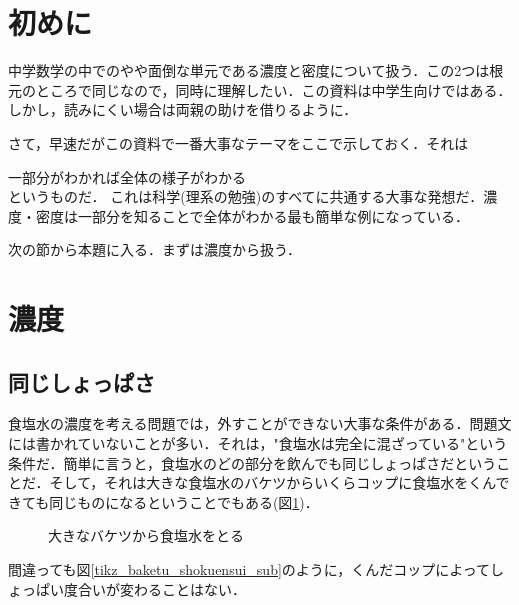 \documentclass[dvipdfmx,18pt]{jsarticle}
\begin{document}
    \section*{初めに}
    中学数学の中でのやや面倒な単元である濃度と密度について扱う．この2つは根元のところで同じなので，同時に理解したい．この資料は中学生向けではある．しかし，読みにくい場合は両親の助けを借りるように．

    さて，早速だがこの資料で一番大事なテーマをここで示しておく．それは

    {\centering 一部分がわかれば全体の様子がわかる\\}
    というものだ．
    これは科学(理系の勉強)のすべてに共通する大事な発想だ．濃度・密度は一部分を知ることで全体がわかる最も簡単な例になっている．


    次の節から本題に入る．まずは濃度から扱う．

    \section{濃度}
    \subsection{同じしょっぱさ}
    食塩水の濃度を考える問題では，外すことができない大事な条件がある．問題文には書かれていないことが多い．それは，"食塩水は完全に混ざっている"という条件だ．簡単に言うと，食塩水のどの部分を飲んでも同じしょっぱさだということだ．そして，それは大きな食塩水のバケツからいくらコップに食塩水をくんできても同じものになるということでもある(図\ref{tikz_baketu_shokuensui})．

    \begin{figure}[htbp]\centering
        \caption{大きなバケツから食塩水をとる}
        \label{tikz_baketu_shokuensui}
    \end{figure}

    間違っても図\ref{tikz_baketu_shokuensui_sub}のように，くんだコップによってしょっぱい度合いが変わることはない．
\end{document}
